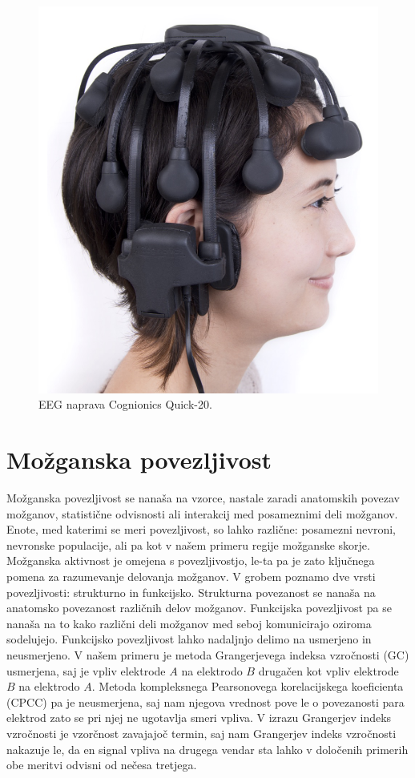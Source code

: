 \begin{figure}[h!]
    \begin{center}
    \includegraphics[width=0.5\linewidth]{slike/Cognionics Quick-20.png}
    \end{center}
    \caption[EEG naprava Cognionics Quick-20.]{EEG naprava Cognionics Quick-20. \cite{CognionicsQUICK20User}}
    \label{slika:quick_20}
    \end{figure}
\section{Možganska povezljivost}
Možganska povezljivost se nanaša na vzorce, nastale zaradi anatomskih povezav možganov, statistične odvisnosti ali interakcij med posameznimi deli možganov. Enote, med katerimi se meri povezljivost, so lahko različne: posamezni nevroni, nevronske populacije, ali pa kot v našem primeru regije možganske skorje. Možganska aktivnost je omejena s povezljivostjo, le-ta pa je zato ključnega pomena za razumevanje delovanja možganov. V grobem poznamo dve vrsti povezljivosti: strukturno in funkcijsko. Strukturna povezanost se nanaša na anatomsko povezanost različnih delov možganov. Funkcijska povezljivost pa se nanaša na to kako različni deli možganov med seboj komunicirajo oziroma sodelujejo.\cite{spornsBrainConnectivity2007} Funkcijsko povezljivost lahko nadaljnjo delimo na usmerjeno in neusmerjeno. V našem primeru je metoda Grangerjevega indeksa vzročnosti (GC) usmerjena, saj je vpliv elektrode $A$ na elektrodo $B$ drugačen kot vpliv elektrode $B$ na elektrodo $A$. Metoda kompleksnega Pearsonovega korelacijskega koeficienta (CPCC) pa je neusmerjena, saj nam njegova vrednost pove le o povezanosti para elektrod zato se pri njej ne ugotavlja smeri vpliva.
V izrazu Grangerjev indeks vzročnosti je vzorčnost zavajajoč termin, saj nam Grangerjev indeks vzročnosti nakazuje le, da en signal vpliva na drugega vendar sta lahko v določenih primerih obe meritvi odvisni od nečesa tretjega.
